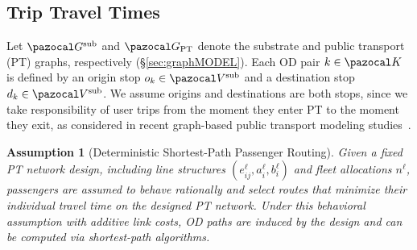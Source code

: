 \documentclass[a4paper,fleqn]{cas-sc}
\newtheorem{assumption}{Assumption}
\begin{document}
\subsection{Trip Travel Times}
\label{sec:trip-travel-times}

Let $\pazocal G^{\text{sub}}$ and $\pazocal G_{\text{PT}}$ denote the substrate and public transport (PT) graphs, respectively (\S\ref{sec:graphMODEL}). Each OD pair $k \in \pazocal K$ is defined by an origin stop $o_k \in \pazocal V^{\text{sub}}$ and a destination stop $d_k \in \pazocal V^{\text{sub}}$.
We assume origins and destinations are both stops, since we take responsibility of user trips from the moment they enter PT to the moment they exit, as considered in recent graph-based public transport modeling studies~\citep{zhao2024origin}.

\begin{assumption}[Deterministic Shortest-Path Passenger Routing]
\label{ass:det_routing}
Given a fixed PT network design, including line structures $(e_{ij}^\ell, a_i^\ell, b_i^\ell)$ and fleet allocations $n^\ell$, passengers are assumed to behave rationally and select routes that minimize their individual travel time on the designed PT network. Under this behavioral assumption with additive link costs, OD paths are induced by the design and can be computed via shortest-path algorithms.
\end{assumption}
\end{document}
